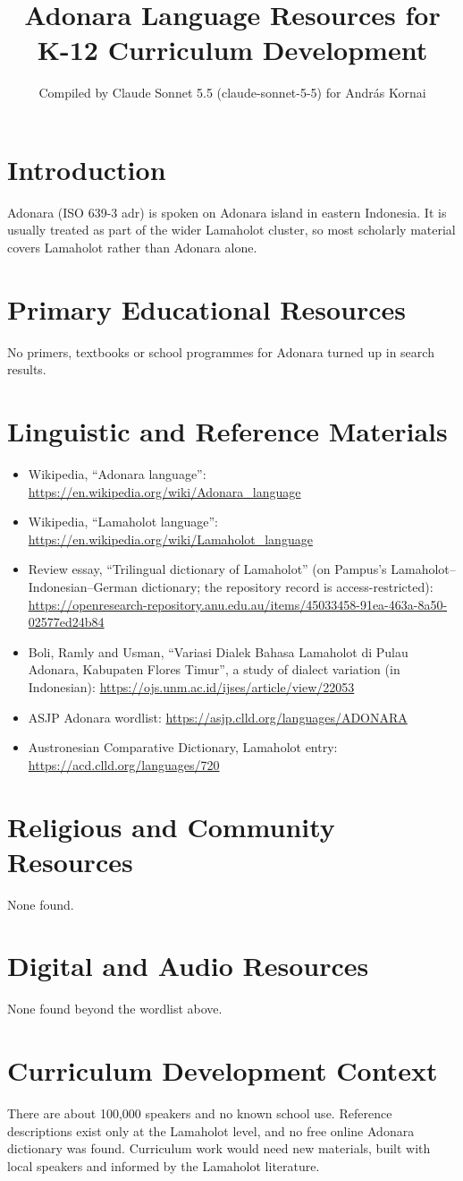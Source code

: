 \documentclass[12pt]{article}
\title{Adonara Language Resources for K-12 Curriculum Development}
\author{Compiled by Claude Sonnet 5.5 (claude-sonnet-5-5) for Andr\'as Kornai}
\date{}
\begin{document}
\maketitle

\section{Introduction}
Adonara (ISO 639-3 adr) is spoken on Adonara island in eastern Indonesia. It is usually treated as part of the wider Lamaholot cluster, so most scholarly material covers Lamaholot rather than Adonara alone.

\section{Primary Educational Resources}
No primers, textbooks or school programmes for Adonara turned up in search results.

\section{Linguistic and Reference Materials}
\begin{itemize}
\item Wikipedia, ``Adonara language'': \url{https://en.wikipedia.org/wiki/Adonara_language}
\item Wikipedia, ``Lamaholot language'': \url{https://en.wikipedia.org/wiki/Lamaholot_language}
\item Review essay, ``Trilingual dictionary of Lamaholot'' (on Pampus's Lamaholot--Indonesian--German dictionary; the repository record is access-restricted): \url{https://openresearch-repository.anu.edu.au/items/45033458-91ea-463a-8a50-02577ed24b84}
\item Boli, Ramly and Usman, ``Variasi Dialek Bahasa Lamaholot di Pulau Adonara, Kabupaten Flores Timur'', a study of dialect variation (in Indonesian): \url{https://ojs.unm.ac.id/ijses/article/view/22053}
\item ASJP Adonara wordlist: \url{https://asjp.clld.org/languages/ADONARA}
\item Austronesian Comparative Dictionary, Lamaholot entry: \url{https://acd.clld.org/languages/720}
\end{itemize}

\section{Religious and Community Resources}
None found.

\section{Digital and Audio Resources}
None found beyond the wordlist above.

\section{Curriculum Development Context}
There are about 100,000 speakers and no known school use. Reference descriptions exist only at the Lamaholot level, and no free online Adonara dictionary was found. Curriculum work would need new materials, built with local speakers and informed by the Lamaholot literature.
\end{document}
